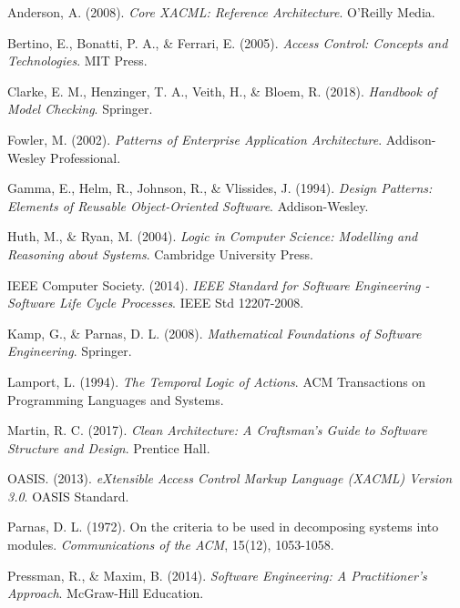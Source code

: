 \documentclass[12pt,a4paper]{article}
\begin{document}
    \begin{thebibliography}{20}

        Anderson, A. (2008). \textit{Core XACML: Reference Architecture}. O'Reilly Media.

        Bertino, E., Bonatti, P. A., \& Ferrari, E. (2005). \textit{Access Control: Concepts and Technologies}. MIT Press.

        Clarke, E. M., Henzinger, T. A., Veith, H., \& Bloem, R. (2018). \textit{Handbook of Model Checking}. Springer.

        Fowler, M. (2002). \textit{Patterns of Enterprise Application Architecture}. Addison-Wesley Professional.

        Gamma, E., Helm, R., Johnson, R., \& Vlissides, J. (1994). \textit{Design Patterns: Elements of Reusable Object-Oriented Software}. Addison-Wesley.

        Huth, M., \& Ryan, M. (2004). \textit{Logic in Computer Science: Modelling and Reasoning about Systems}. Cambridge University Press.

        IEEE Computer Society. (2014). \textit{IEEE Standard for Software Engineering - Software Life Cycle Processes}. IEEE Std 12207-2008.

        Kamp, G., \& Parnas, D. L. (2008). \textit{Mathematical Foundations of Software Engineering}. Springer.

        Lamport, L. (1994). \textit{The Temporal Logic of Actions}. ACM Transactions on Programming Languages and Systems.

        Martin, R. C. (2017). \textit{Clean Architecture: A Craftsman's Guide to Software Structure and Design}. Prentice Hall.

        OASIS. (2013). \textit{eXtensible Access Control Markup Language (XACML) Version 3.0}. OASIS Standard.

        Parnas, D. L. (1972). On the criteria to be used in decomposing systems into modules. \textit{Communications of the ACM}, 15(12), 1053-1058.

        Pressman, R., \& Maxim, B. (2014). \textit{Software Engineering: A Practitioner's Approach}. McGraw-Hill Education.


\end{thebibliography}
\end{document}
